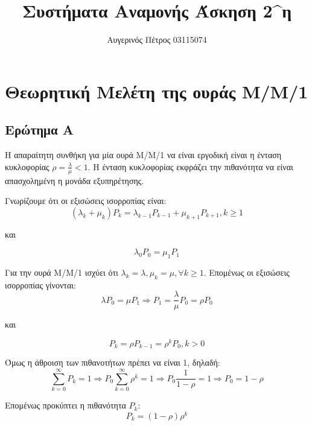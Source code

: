 \documentclass[12pt]{article}
\author{Αυγερινός Πέτρος 03115074}
\title{Συστήματα Αναμονής Άσκηση 2^η}
\date{}
\begin{document}
\maketitle 
\pagebreak

\tableofcontents


\pagebreak

\section{Θεωρητική Μελέτη της ουράς Μ/Μ/1}

\subsection{Ερώτημα Α}
Η απαραίτητη συνθήκη για μία ουρά Μ/Μ/1 να είναι εργοδική είναι η ένταση
κυκλοφορίας $\rho = \frac{\lambda}{\mu} < 1$. Η ένταση κυκλοφορίας εκφράζει
την πιθανότητα να είναι απασχολημένη η μονάδα εξυπηρέτησης.

Γνωρίζουμε ότι οι εξισώσεις ισορροπίας είναι: 
\begin{equation}
    (\lambda_k + \mu_k)P_k = \lambda_{k-1}P_{k-1} + \mu_{k+1}P_{k+1},  k \ge 1
\end{equation}

και 

\begin{equation}
    \lambda_0P_0 = \mu_1P_1
\end{equation}

Για την ουρά Μ/Μ/1 ισχύει ότι $\lambda_k = \lambda, \mu_k = \mu, \forall k \ge 1$.
Επομένως οι εξισώσεις ισορροπίας γίνονται:
\begin{equation}
    \lambda P_0 = \mu P_1 \Rightarrow P_1 = \frac{\lambda}{\mu}P_0 = \rho P_0
\end{equation}

και

\begin{equation}
    P_k = \rho P_{k-1} = \rho^k P_0, k > 0
\end{equation}

Όμως η άθροιση των πιθανοτήτων πρέπει να είναι 1, δηλαδή:
\begin{equation}
    \sum_{k=0}^{\infty} P_k = 1 \Rightarrow P_0 \sum_{k=0}^{\infty} \rho^k = 1 \Rightarrow P_0 \frac{1}{1-\rho} = 1 \Rightarrow P_0 = 1 - \rho
\end{equation}

Επομένως προκύπτει η πιθανότητα $P_k$:
\begin{equation}
    P_k = (1-\rho)\rho^k
\end{equation}
\end{document}
